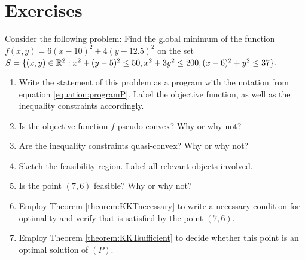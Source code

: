 
\section*{Exercises}

\begin{problem}[Basic]
Consider the following problem: Find the global minimum of the function $f(x,y) = 6(x-10)^2+4(y-12.5)^2$ on the set $S = \{ (x,y) \in \mathbb{R}^2 : x^2+(y-5)^2 \leq 50, x^2+3y^2\leq 200, (x-6)^2+y^2 \leq 37 \}$.
\begin{enumerate}
	\item Write the statement of this problem as a program with the notation from equation \ref{equation:programP}.  Label the objective function, as well as the inequality constraints accordingly.
	\item Is the objective function $f$ pseudo-convex? Why or why not?
	\item Are the inequality constraints quasi-convex?  Why or why not?
	\item Sketch the feasibility region.  Label all relevant objects involved.
	\item Is the point $(7,6)$ feasible?  Why or why not?
	\item Employ Theorem \ref{theorem:KKTnecessary} to write a necessary condition for optimality and verify that is satisfied by the point $(7,6)$.
	\item Employ Theorem \ref{theorem:KKTsufficient} to decide whether this point is an optimal solution of $(P)$.
\end{enumerate}
\end{problem}
